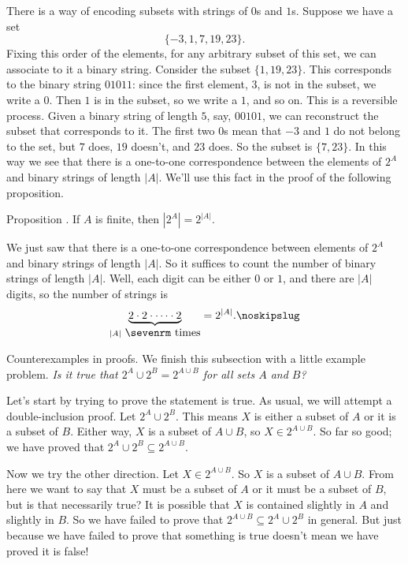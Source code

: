 There is a way of encoding subsets with strings of $0$s and $1$s. Suppose we have a set
$$\{-3, 1, 7, 19, 23\}.$$
Fixing this order of the elements, for any arbitrary subset of this set, we can associate to it a binary string.
Consider the subset $\{1, 19, 23\}$. This corresponds to the binary string $01011$: since the first element,
$3$, is not in the subset, we write a $0$. Then $1$ is in the subset, so we write a $1$, and so on.
This is a reversible process. Given a binary string of length $5$, say, $00101$, we can reconstruct the
subset that corresponds to it. The first two $0$s mean that $-3$ and $1$ do not belong to the set,
but $7$ does, $19$ doesn't, and $23$ does. So the subset is $\{7, 23\}$. In this way we see that there
is a one-to-one correspondence between the elements of $2^A$ and binary strings of length $|A|$.
We'll use this fact in the proof of the following proposition.

\edef\propcardpowerset{\the\thmcount}
\proclaim Proposition \advthm. If $A$ is finite, then
$|2^A| = 2^{|A|}$.

\proof We just saw that there is a one-to-one correspondence between elements of $2^A$ and binary strings
of length $|A|$. So it suffices to count the number of binary strings of length $|A|$. Well, each digit
can be either $0$ or $1$, and there are $|A|$ digits, so the number of strings is
$$\underbrace{2\cdot 2\cdot \cdots \cdot 2}_{|A|\ \hbox{\sevenrm times}} = 2^{|A|}.\noskipslug$$

\medskip\boldlabel Counterexamples in proofs.
We finish this subsection with a little example problem. {\sl Is it true that $2^A \cup 2^B = 2^{A\cup B}$
for all sets $A$ and $B$?}

Let's start by trying to prove the statement is true. As usual, we will attempt a double-inclusion proof.
Let $2^A\cup 2^B$. This means $X$ is either a subset of $A$ or it is a subset of $B$. Either way,
$X$ is a subset of $A\cup B$, so $X\in 2^{A\cup B}$. So far so good; we have proved that
$2^A\cup 2^B \subseteq 2^{A\cup B}$.

Now we try the other direction. Let $X\in 2^{A\cup B}$. So $X$ is a subset of $A\cup B$. From here
we want to say that $X$ must be a subset of $A$ or it must be a subset of $B$, but is that necessarily true?
It is possible that $X$ is contained slightly in $A$ and slightly in $B$. So we have failed
to prove that $2^{A\cup B} \subseteq 2^A \cup 2^B$ in general. But just because we have failed to prove
that something is true doesn't mean we have proved it is false!

